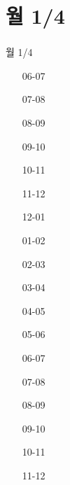 \documentclass[aspectratio=1610,20pt,xcolor=pdftex,dvipsnames,table,handout]{beamer}
\begin{document}
	\section{월 1/4}											
	\begin{frame} [t,plain]											
	\frametitle{}											
		\begin{block} {월 1/4}										
		\setlength{\leftmargini}{3em}										
		\begin{itemize}										
			\item [06-07] \hrulefill									
			\item [07-08] \hrulefill									
			\item [08-09] \hrulefill									
			\item [09-10] \hrulefill									
			\item [10-11] \hrulefill									
			\item [11-12] \hrulefill									
			\item [12-01] \hrulefill									
			\item [01-02] \hrulefill									
			\item [02-03] \hrulefill									
			\item [03-04] \hrulefill									
			\item [04-05] \hrulefill	
			\item [05-06] \hrulefill									
			\item [06-07] \hrulefill									
			\item [07-08] \hrulefill			
			\item [08-09] \hrulefill									
			\item [09-10] \hrulefill									
			\item [10-11] \hrulefill									
			\item [11-12] \hrulefill									
		\end{itemize}										
		\end{block}										
	\end{frame}											
												
\end{document}
